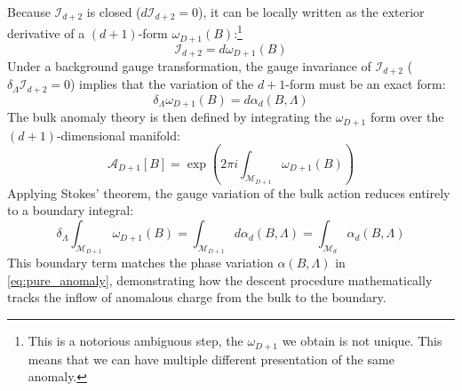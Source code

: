\documentclass[aps,preprint,nofootinbib,preprintnumbers,eqsecnum,superscriptaddress]{revtex4}
\numberwithin{equation}{section}
\begin{document}
Because $\mathcal{I}_{d+2}$ is closed ($d\mathcal{I}_{d+2} = 0$), it can be locally written as the exterior derivative of a $(d+1)$-form $\omega_{D+1}(B)$:\footnote{This is a notorious ambiguous step, the $\omega_{D+1}$ we obtain is not unique. This means that we can have multiple different presentation of the same anomaly.}
\begin{equation}
    \mathcal{I}_{d+2} = d\omega_{D+1}(B)
\end{equation}
Under a background gauge transformation, the gauge invariance of $\mathcal{I}_{d+2}$ ($ \delta_{\Lambda} \mathcal{I}_{d+2} = 0 $) implies that the variation of the $d+1$-form must be an exact form:
\begin{equation}
    \delta_{\Lambda} \omega_{D+1}(B) = d\alpha_d(B, \Lambda)
\end{equation}
The bulk anomaly theory is then defined by integrating the $\omega_{D+1}$ form over the $(d+1)$-dimensional manifold:
\begin{equation}
    \mathcal{A}_{D+1}[B] = \exp\left( 2\pi i \int_{\mathcal{M}_{D+1}} \omega_{D+1}(B) \right)
\end{equation}
Applying Stokes' theorem, the gauge variation of the bulk action reduces entirely to a boundary integral:
\begin{equation}
    \delta_{\Lambda} \int_{\mathcal{M}_{D+1}} \omega_{D+1}(B) = \int_{\mathcal{M}_{D+1}} d\alpha_d(B, \Lambda) = \int_{\mathcal{M}_d} \alpha_d(B, \Lambda)
\end{equation}
This boundary term matches the phase variation $\alpha(B, \Lambda)$ in \ref{eq:pure_anomaly}, demonstrating how the descent procedure mathematically tracks the inflow of anomalous charge from the bulk to the boundary.


  
\end{document}
